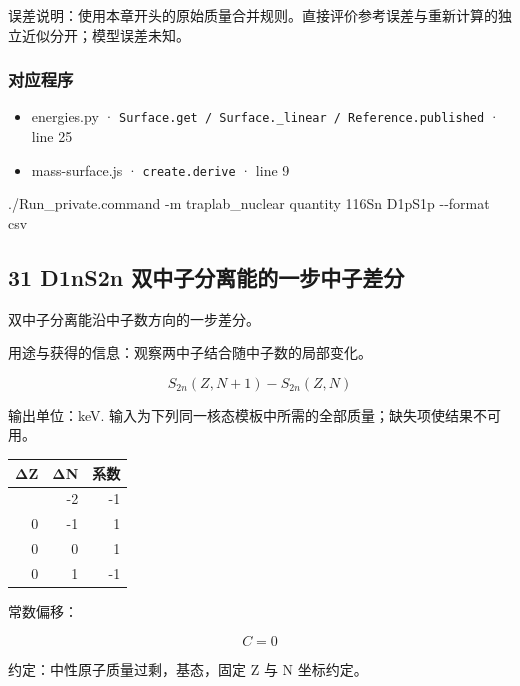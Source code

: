 \documentclass[
  11pt,
  letterpaper,
]{article}
\newenvironment{Shaded}{}{}
\newcommand{\AttributeTok}[1]{\textcolor[rgb]{0.49,0.56,0.16}{#1}}
\newcommand{\ExtensionTok}[1]{#1}
\newcommand{\NormalTok}[1]{#1}
\providecommand{\tightlist}{%
  \setlength{\itemsep}{0pt}\setlength{\parskip}{0pt}}
\begin{document}
误差说明：使用本章开头的原始质量合并规则。直接评价参考误差与重新计算的独立近似分开；模型误差未知。

\subsubsection{对应程序}\label{ux5bf9ux5e94ux7a0bux5e8f-29}

\begin{itemize}
\tightlist
\item
  energies.py ·
  \texttt{Surface.get\ /\ Surface.\_linear\ /\ Reference.published} ·
  line 25
\item
  mass-surface.js · \texttt{create.derive} · line 9
\end{itemize}

\begin{Shaded}
\begin{Highlighting}[]
\ExtensionTok{./Run\_private.command} \AttributeTok{{-}m}\NormalTok{ traplab\_nuclear quantity 116Sn D1pS1p }\AttributeTok{{-}{-}format}\NormalTok{ csv}
\end{Highlighting}
\end{Shaded}

\subsection{31 D1nS2n
双中子分离能的一步中子差分}\label{d1ns2n-ux53ccux4e2dux5b50ux5206ux79bbux80fdux7684ux4e00ux6b65ux4e2dux5b50ux5deeux5206}

双中子分离能沿中子数方向的一步差分。

用途与获得的信息：观察两中子结合随中子数的局部变化。

\[
S_{2n}(Z,N+1)-S_{2n}(Z,N)
\]

输出单位：keV.
输入为下列同一核态模板中所需的全部质量；缺失项使结果不可用。

\begin{longtable}[]{@{}rrr@{}}
\toprule\noalign{}
ΔZ & ΔN & 系数 \\
\midrule\noalign{}
\endhead
\bottomrule\noalign{}
\endlastfoot
0 & -2 & -1 \\
0 & -1 & 1 \\
0 & 0 & 1 \\
0 & 1 & -1 \\
\end{longtable}

常数偏移：

\[
C=0
\]

约定：中性原子质量过剩，基态，固定 Z 与 N 坐标约定。
\end{document}
